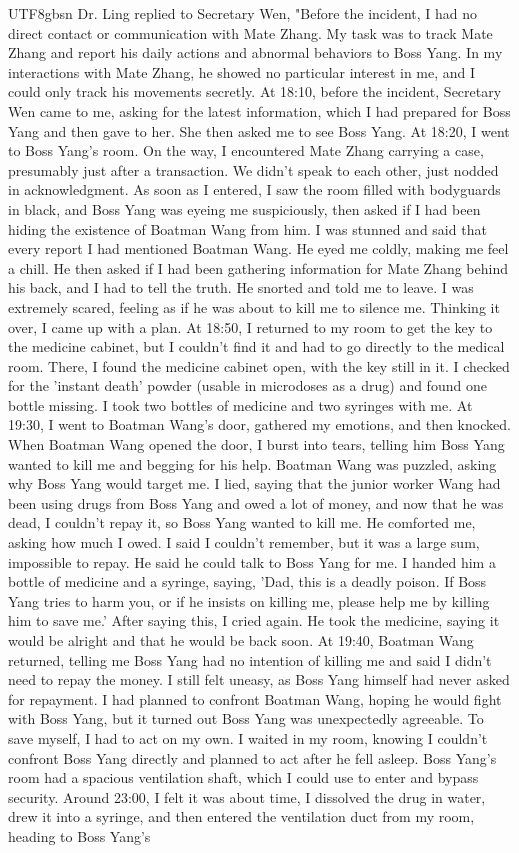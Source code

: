 \documentclass[11pt]{article}
\begin{document}
{\begin{CJK}{UTF8}{gbsn}
Dr. Ling replied to Secretary Wen, "Before the incident, I had no direct contact or communication with Mate Zhang. My task was to track Mate Zhang and report his daily actions and abnormal behaviors to Boss Yang. In my interactions with Mate Zhang, he showed no particular interest in me, and I could only track his movements secretly. At 18:10, before the incident, Secretary Wen came to me, asking for the latest information, which I had prepared for Boss Yang and then gave to her. She then asked me to see Boss Yang. At 18:20, I went to Boss Yang's room. On the way, I encountered Mate Zhang carrying a case, presumably just after a transaction. We didn’t speak to each other, just nodded in acknowledgment. As soon as I entered, I saw the room filled with bodyguards in black, and Boss Yang was eyeing me suspiciously, then asked if I had been hiding the existence of Boatman Wang from him. I was stunned and said that every report I had mentioned Boatman Wang. He eyed me coldly, making me feel a chill. He then asked if I had been gathering information for Mate Zhang behind his back, and I had to tell the truth. He snorted and told me to leave. I was extremely scared, feeling as if he was about to kill me to silence me. Thinking it over, I came up with a plan. At 18:50, I returned to my room to get the key to the medicine cabinet, but I couldn’t find it and had to go directly to the medical room. There, I found the medicine cabinet open, with the key still in it. I checked for the 'instant death' powder (usable in microdoses as a drug) and found one bottle missing. I took two bottles of medicine and two syringes with me. At 19:30, I went to Boatman Wang's door, gathered my emotions, and then knocked. When Boatman Wang opened the door, I burst into tears, telling him Boss Yang wanted to kill me and begging for his help. Boatman Wang was puzzled, asking why Boss Yang would target me. I lied, saying that the junior worker Wang had been using drugs from Boss Yang and owed a lot of money, and now that he was dead, I couldn’t repay it, so Boss Yang wanted to kill me. He comforted me, asking how much I owed. I said I couldn’t remember, but it was a large sum, impossible to repay. He said he could talk to Boss Yang for me. I handed him a bottle of medicine and a syringe, saying, 'Dad, this is a deadly poison. If Boss Yang tries to harm you, or if he insists on killing me, please help me by killing him to save me.' After saying this, I cried again. He took the medicine, saying it would be alright and that he would be back soon. At 19:40, Boatman Wang returned, telling me Boss Yang had no intention of killing me and said I didn't need to repay the money. I still felt uneasy, as Boss Yang himself had never asked for repayment. I had planned to confront Boatman Wang, hoping he would fight with Boss Yang, but it turned out Boss Yang was unexpectedly agreeable. To save myself, I had to act on my own. I waited in my room, knowing I couldn’t confront Boss Yang directly and planned to act after he fell asleep. Boss Yang's room had a spacious ventilation shaft, which I could use to enter and bypass security. Around 23:00, I felt it was about time, I dissolved the drug in water, drew it into a syringe, and then entered the ventilation duct from my room, heading to Boss Yang’s 
\end{CJK}}
\end{document}
